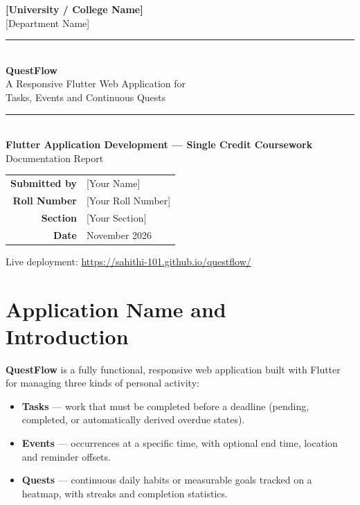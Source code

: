 \documentclass[12pt,a4paper]{article}
\begin{document}
\begin{titlepage}
  \centering
  \vspace*{2cm}
  {\Large \textbf{[University / College Name]}\\[4pt]
  \large [Department Name]\\[1cm]}
  \rule{\linewidth}{0.6pt}\\[0.4cm]
  {\huge \textbf{QuestFlow}\\[0.4cm]
  \Large A Responsive Flutter Web Application for\\ Tasks, Events and Continuous Quests\\[0.2cm]}
  \rule{\linewidth}{0.6pt}\\[1.2cm]

  {\large \textbf{Flutter Application Development — Single Credit Coursework}\\[2pt]
  Documentation Report\\[1.5cm]}

  \begin{tabular}{rl}
    \textbf{Submitted by} & [Your Name] \\[6pt]
    \textbf{Roll Number} & [Your Roll Number] \\[6pt]
    \textbf{Section}     & [Your Section] \\[6pt]
    \textbf{Date}        & November 2026 \\
  \end{tabular}

  \vfill
  {\large Live deployment: \url{https://sahithi-101.github.io/questflow/}}
  \vspace{1cm}
\end{titlepage}

\tableofcontents
\newpage

\section{Application Name and Introduction}

\textbf{QuestFlow} is a fully functional, responsive web application built
with Flutter for managing three kinds of personal activity:

\begin{itemize}
  \item \textbf{Tasks} — work that must be completed before a deadline
        (pending, completed, or automatically derived overdue states).
  \item \textbf{Events} — occurrences at a specific time, with optional end
        time, location and reminder offsets.
  \item \textbf{Quests} — continuous daily habits or measurable goals
        tracked on a heatmap, with streaks and completion statistics.
\end{itemize}
\end{document}
